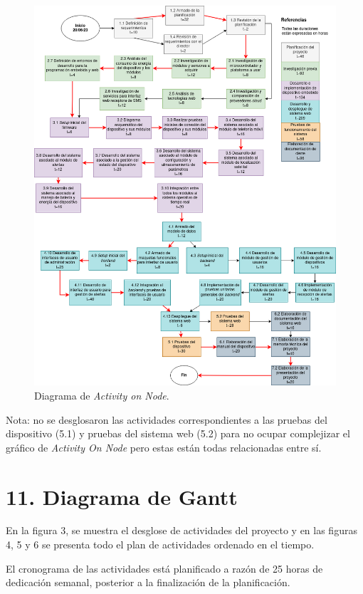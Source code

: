\documentclass[
11pt, %
]{charter}
\begin{document}
\begin{figure}[htpb]
\centering 
\includegraphics[width=.9\textwidth]{./Figuras/AoN.png}
\caption{Diagrama de \textit{Activity on Node}.}
\label{fig:AoN}
\end{figure}

Nota: no se desglosaron las actividades correspondientes a las pruebas del dispositivo (5.1) y pruebas del sistema web (5.2) para no ocupar complejizar el gráfico de \textit{Activity On Node} pero estas están todas relacionadas entre sí.

\section{11. Diagrama de Gantt}
\label{sec:gantt}

En la figura 3, se muestra el desglose de actividades del proyecto y en las figuras 4, 5 y 6 se presenta todo el plan de actividades ordenado en el tiempo.

El cronograma de las actividades está planificado a razón de 25 horas de dedicación semanal, posterior a la finalización de la planificación.
 
\end{document}
